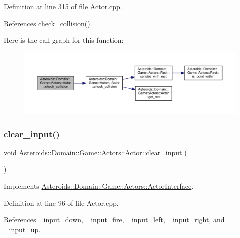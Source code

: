 Definition at line 315 of file Actor.\+cpp.



References check\+\_\+collision().

Here is the call graph for this function\+:\nopagebreak
\begin{figure}[H]
\begin{center}
\leavevmode
\includegraphics[width=350pt]{classAsteroids_1_1Domain_1_1Game_1_1Actors_1_1Actor_aa9baec5098ef0bcc7bb8675881919c7f_cgraph}
\end{center}
\end{figure}
\mbox{\label{classAsteroids_1_1Domain_1_1Game_1_1Actors_1_1Actor_a3678c27cfb63d8b4eb9b0aa64e352ee1}} 
\subsubsection{\texorpdfstring{clear\+\_\+input()}{clear\_input()}}
{\footnotesize\ttfamily void Asteroids\+::\+Domain\+::\+Game\+::\+Actors\+::\+Actor\+::clear\+\_\+input (\begin{DoxyParamCaption}{ }\end{DoxyParamCaption})\hspace{0.3cm}{\ttfamily [virtual]}}



Implements \hyperlink{classAsteroids_1_1Domain_1_1Game_1_1Actors_1_1ActorInterface_a168455859e83a22084c372ea19de13fd}{Asteroids\+::\+Domain\+::\+Game\+::\+Actors\+::\+Actor\+Interface}.



Definition at line 96 of file Actor.\+cpp.



References \+\_\+input\+\_\+down, \+\_\+input\+\_\+fire, \+\_\+input\+\_\+left, \+\_\+input\+\_\+right, and \+\_\+input\+\_\+up.




